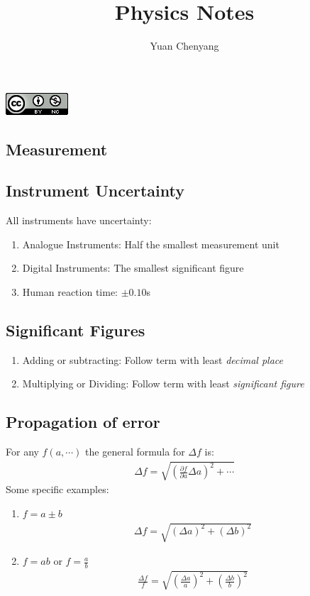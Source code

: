 \documentclass[11pt]{article}
\title{Physics Notes}
\author{Yuan Chenyang}
\makeatletter
\renewcommand\tableofcontents{%
    \@starttoc{toc}%
}
\makeatother
\begin{document}
\maketitle
\begin{center}
\includegraphics[scale=0.7]{deed.png} 
\end{center}

\begin{multicols}{2}
\tableofcontents
\end{multicols}
\newpage

\begin{multicols*}{3}
\section{Measurement}
\subsection{Instrument Uncertainty}
All instruments have uncertainty:
\begin{enumerate}
\item Analogue Instruments: Half the smallest measurement unit
\item Digital Instruments: The smallest significant figure
\item Human reaction time: $\pm 0.10$s
\end{enumerate}
\subsection{Significant Figures}
\begin{enumerate}
\item Adding or subtracting: Follow term with least {\em decimal place}
\item Multiplying or Dividing: Follow term with least {\em significant figure}
\end{enumerate}
\subsection{Propagation of error}
For any $f(a, \cdots)$ the general formula for $\Delta f$ is:
	\begin{align*}
	\Delta f = \sqrt{\left( \frac{\partial f}{\partial a} \Delta a \right)^2 + \cdots}
	\end{align*}
Some specific examples:
\begin{enumerate}
\item $f=a\pm b$
	\begin{align*}
	\Delta f = \sqrt{(\Delta a)^2+(\Delta b)^2}
	\end{align*}
\item $f=ab$ or $f=\frac{a}{b}$
	\begin{align*}
	\frac{\Delta f}{f} = \sqrt{\left(\frac{\Delta a}{a} \right)^2+\left(\frac{\Delta b}{b} \right)^2}
	\end{align*}
\end{enumerate}

\end{multicols*}
\end{document}
